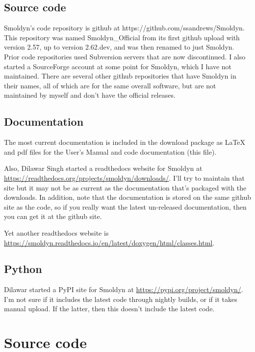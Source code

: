 \documentclass {scrbook}
\begin{document}
\subsection{Source code}

Smoldyn's code repository is github at https://github.com/ssandrews/Smoldyn. This repository was named Smoldyn\_Official from its first github upload with version 2.57, up to version 2.62.dev, and was then renamed to just Smoldyn. Prior code repositories used Subversion servers that are now discontinued. I also started a SourceForge account at some point for Smoldyn, which I have not maintained. There are several other github repositories that have Smoldyn in their names, all of which are for the same overall software, but are not maintained by myself and don't have the official releases.

\subsection{Documentation}

The most current documentation is included in the download package as LaTeX and pdf files for the User's Manual and code documentation (this file).

Also, Dilawar Singh started a readthedocs website for Smoldyn at \url{https://readthedocs.org/projects/smoldyn/downloads/}. I'll try to maintain that site but it may not be as current as the documentation that's packaged with the downloads. In addition, note that the documentation is stored on the same github site as the code, so if you really want the latest un-released documentation, then you can get it at the github site.

Yet another readthedocs website is \url{https://smoldyn.readthedocs.io/en/latest/doxygen/html/classes.html}.

\subsection{Python}

Dilawar started a PyPI site for Smoldyn at \url{https://pypi.org/project/smoldyn/}. I'm not sure if it includes the latest code through nightly builds, or if it takes manual upload. If the latter, then this doesn't include the latest code.


\section{Source code}
\end{document}
